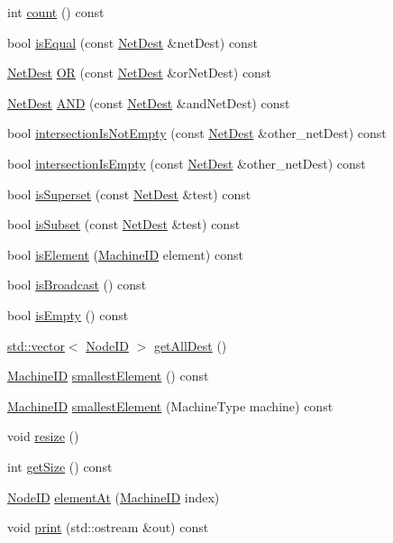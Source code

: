 \begin{DoxyCompactItemize}
int \hyperlink{classNetDest_a0745638c9967e2ed90bc96c012288c55}{count} () const 
\item 
bool \hyperlink{classNetDest_a44890b1d643633daca78f39ba500a351}{isEqual} (const \hyperlink{classNetDest}{NetDest} \&netDest) const 
\item 
\hyperlink{classNetDest}{NetDest} \hyperlink{classNetDest_aadbbe10effe51d7a2d176c22332d0848}{OR} (const \hyperlink{classNetDest}{NetDest} \&orNetDest) const 
\item 
\hyperlink{classNetDest}{NetDest} \hyperlink{classNetDest_a682e493a493cef580f21f2fb26db3db1}{AND} (const \hyperlink{classNetDest}{NetDest} \&andNetDest) const 
\item 
bool \hyperlink{classNetDest_ac6846c5f0b48a8c8016e72f9e7a87616}{intersectionIsNotEmpty} (const \hyperlink{classNetDest}{NetDest} \&other\_\-netDest) const 
\item 
bool \hyperlink{classNetDest_a21c3996c8289a60f84da64a30c5c0857}{intersectionIsEmpty} (const \hyperlink{classNetDest}{NetDest} \&other\_\-netDest) const 
\item 
bool \hyperlink{classNetDest_a67c52cd92c924ccfeb6ca7e7a5949283}{isSuperset} (const \hyperlink{classNetDest}{NetDest} \&test) const 
\item 
bool \hyperlink{classNetDest_a9d92bf92ac849151b567a0976cc2dd96}{isSubset} (const \hyperlink{classNetDest}{NetDest} \&test) const 
\item 
bool \hyperlink{classNetDest_a906c9c311078ad8acf27e8920e44030d}{isElement} (\hyperlink{structMachineID}{MachineID} element) const 
\item 
bool \hyperlink{classNetDest_ad6e06804cf170a9f5925776696c32060}{isBroadcast} () const 
\item 
bool \hyperlink{classNetDest_a479432127ee77145cc19d6a2d1590821}{isEmpty} () const 
\item 
\hyperlink{classstd_1_1vector}{std::vector}$<$ \hyperlink{TypeDefines_8hh_a83c14b4ae37e80071f6b3506a6c46151}{NodeID} $>$ \hyperlink{classNetDest_a44d9161ca3a378dcfa4f127cba7e7a37}{getAllDest} ()
\item 
\hyperlink{structMachineID}{MachineID} \hyperlink{classNetDest_a73f74fff96db0012ec8044ba80b48a8b}{smallestElement} () const 
\item 
\hyperlink{structMachineID}{MachineID} \hyperlink{classNetDest_a9ef07d7ecdc0b533221760be92a9865d}{smallestElement} (MachineType machine) const 
\item 
void \hyperlink{classNetDest_a0fc3d585aa53859602ac79c9c421f2a9}{resize} ()
\item 
int \hyperlink{classNetDest_a4f8dbb76319fe40792867d6ca51ef447}{getSize} () const 
\item 
\hyperlink{TypeDefines_8hh_a83c14b4ae37e80071f6b3506a6c46151}{NodeID} \hyperlink{classNetDest_a07fad8a8a4b3e4ebf730a781d1e9ed33}{elementAt} (\hyperlink{structMachineID}{MachineID} index)
\item 
void \hyperlink{classNetDest_ac55fe386a101fbae38c716067c9966a0}{print} (std::ostream \&out) const 
\end{DoxyCompactItemize}
